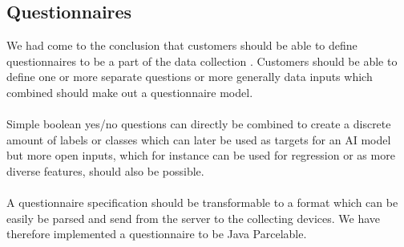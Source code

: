 
\subsection{Questionnaires}
We had come to the conclusion that customers should be able to define questionnaires to be a part of the data collection . Customers should be able to define one or more separate questions or more generally data inputs which combined should make out a questionnaire model. 
\\\\
Simple boolean yes/no questions can directly be combined to create a discrete amount of labels or classes which can later be used as targets for an AI model but more open inputs, which for instance can be used for regression or as more diverse features, should also be possible. 
\\\\
A questionnaire specification should be transformable to a format which can be easily be parsed and send from the server to the collecting devices. We have therefore implemented a questionnaire to be Java Parcelable. 

